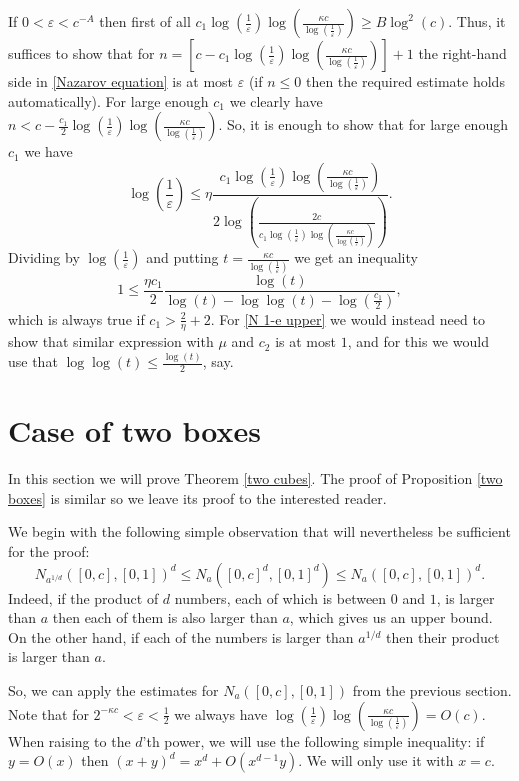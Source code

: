 \documentclass[12pt]{amsart}
\numberwithin{equation}{section}
\newcommand{\eps}{\varepsilon}
\begin{document}
If $0 < \eps < c^{-A}$ then first of all $c_1 \log\left(\frac{1}{\eps}\right) \log\left(\frac{\kappa c}{\log(\frac{1}{\eps})}\right) \ge B\log^2(c)$. Thus, it suffices to show that for $n = \left[c-c_1 \log\left(\frac{1}{\eps}\right) \log\left(\frac{\kappa c}{\log(\frac{1}{\eps})}\right)\right]+1$ the right-hand side in \eqref{Nazarov equation} is at most $\eps$ (if $n\leq 0$ then the required estimate holds automatically). For large enough $c_1$ we clearly have $n < c - \frac{c_1}{2}\log\left(\frac{1}{\eps}\right) \log\left(\frac{\kappa c}{\log(\frac{1}{\eps})}\right)$. So, it is enough to show that for large enough $c_1$ we have
$$\log\left(\frac{1}{\eps}\right) \le\eta\frac{c_1\log\left(\frac{1}{\eps}\right) \log\left(\frac{\kappa c}{\log(\frac{1}{\eps})}\right)}{2\log\left(\frac{2c}{c_1\log\left(\frac{1}{\eps}\right) \log\left(\frac{\kappa c}{\log(\frac{1}{\eps})}\right)}\right)}.$$
Dividing by $\log\left(\frac{1}{\eps}\right)$ and putting $t=\frac{\kappa c}{\log\left(\frac{1}{\eps}\right)}$ we get an inequality
$$1\le \frac{\eta c_1}{2} \frac{\log(t)}{\log(t)-\log\log(t)-\log(\frac{c_1}{2})},$$
which is always true if $c_1 > \frac{2}{\eta}+2$. For \eqref{N 1-e upper} we would instead need to show that similar expression with $\mu$ and $c_2$ is at most $1$, and for this we would use that $\log \log(t) \le \frac{\log(t)}{2}$, say.
\section{Case of two boxes}
In this section we will prove Theorem \ref{two cubes}. The proof of Proposition \ref{two boxes} is similar so we leave its proof to the interested reader.

We begin with the following simple observation that will nevertheless be sufficient for the proof:
\begin{equation}\label{N trick}
N_{a^{1/d}}([0, c], [0,1])^d\le N_a([0,c]^d,[0,1]^d)\le N_a([0,c],[0,1])^d.
\end{equation}
Indeed, if the product of $d$ numbers, each of which is between $0$ and $1$, is larger than $a$ then each of them is also larger than $a$, which gives us an upper bound. On the other hand, if each of the numbers is larger than $a^{1/d}$ then their product is larger than $a$.

So, we can apply the estimates for $N_a([0,c],[0,1])$ from the previous section. Note that for $2^{-\kappa c} < \eps < \frac{1}{2}$ we always have  $\log\left(\frac{1}{\eps}\right) \log\left(\frac{\kappa c}{\log(\frac{1}{\eps})}\right) = O(c)$. When raising to the $d$'th power, we will use the following simple inequality: if $y = O(x)$ then $(x+y)^d = x^d + O(x^{d-1}y)$. We will only use it with $x = c$.
\end{document}
